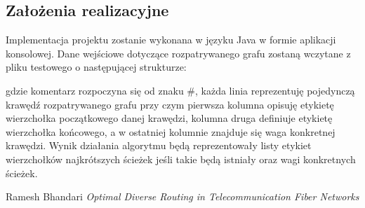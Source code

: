 \documentclass[10pt,a4paper]{article}
\begin{document}
\subsection{Założenia realizacyjne}
Implementacja projektu zostanie wykonana w języku Java w formie aplikacji konsolowej. Dane wejściowe dotyczące rozpatrywanego grafu zostaną wczytane z pliku testowego o następującej strukturze:



gdzie komentarz rozpoczyna się od znaku \#, każda linia reprezentuję pojedynczą krawędź rozpatrywanego grafu przy czym pierwsza kolumna opisuję etykietę wierzchołka początkowego danej krawędzi, kolumna druga definiuje etykietę wierzchołka końcowego, a w ostatniej kolumnie znajduje się waga konkretnej krawędzi. Wynik działania algorytmu będą reprezentowały listy etykiet wierzchołków najkrótszych ścieżek jeśli takie będą istniały oraz wagi konkretnych ścieżek.

\begin{thebibliography}{9}
 Ramesh Bhandari \emph{Optimal Diverse Routing in Telecommunication Fiber Networks}
\end{thebibliography}
\end{document}
